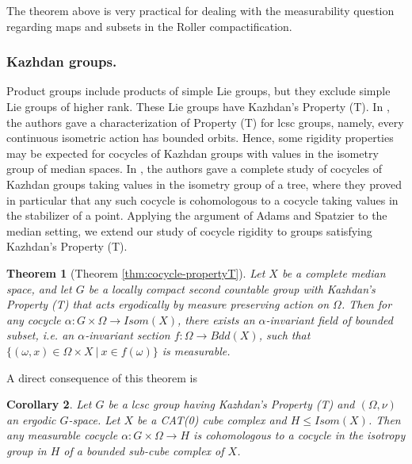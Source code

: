 \documentclass{amsart}
\numberwithin{equation}{section}
\newtheorem{theorem}{Theorem}
\newtheorem{corollary}[theorem]{Corollary}
\theoremstyle{definition}
\begin{document}
The theorem above is very practical for dealing with the measurability question regarding maps and subsets in the Roller compactification.\par 



\subsubsection{Kazhdan groups.}

Product groups include products of simple Lie groups, but they exclude simple Lie groups of higher rank. These Lie groups have Kazhdan's Property (T). In \cite{ChaDH_median}, the authors gave a characterization of Property (T) for lcsc groups, namely, every continuous isometric action has bounded orbits. Hence, some rigidity properties may be expected for cocycles of Kazhdan groups with values in the isometry group of median spaces. In \cite{AdamsSpatzier}, the authors gave a complete study of cocycles of Kazhdan groups taking values in the isometry group of a tree, where they proved in particular that any such cocycle is cohomologous to a cocycle taking values in the stabilizer of a point. Applying the argument of Adams and Spatzier to the median setting, we extend our study of cocycle rigidity to groups satisfying Kazhdan’s Property (T).
\begin{theorem}[Theorem \ref{thm:cocycle-propertyT}]
    Let $X$ be a complete median space, and let $G$ be a locally compact second countable group with Kazhdan's Property (T) that acts ergodically by measure preserving action on $\Omega$. Then for any cocycle $\alpha:G\times\Omega\rightarrow Isom(X)$, there exists an $\alpha$-invariant field of bounded subset, i.e. an $\alpha$-invariant section $f:\Omega\rightarrow Bdd(X)$, such that $\{(\omega,x)\in \Omega\times X\ |\ x\in f(\omega)\}$ is measurable. 
\end{theorem}

A direct consequence of this theorem is
\begin{corollary}\label{intro:cocycle_cube_propertyT}
   Let $G$ be a lcsc group having Kazhdan's Property (T) and $(\Omega,\nu)$ an ergodic $G$-space. Let $X$ be a CAT(0) cube complex and $H \leq Isom(X)$. Then any measurable cocycle $\alpha: G \times \Omega \to H$ is cohomologous to a cocycle in the isotropy group in $H$ of a bounded sub-cube complex of $X$.
\end{corollary}
\end{document}

